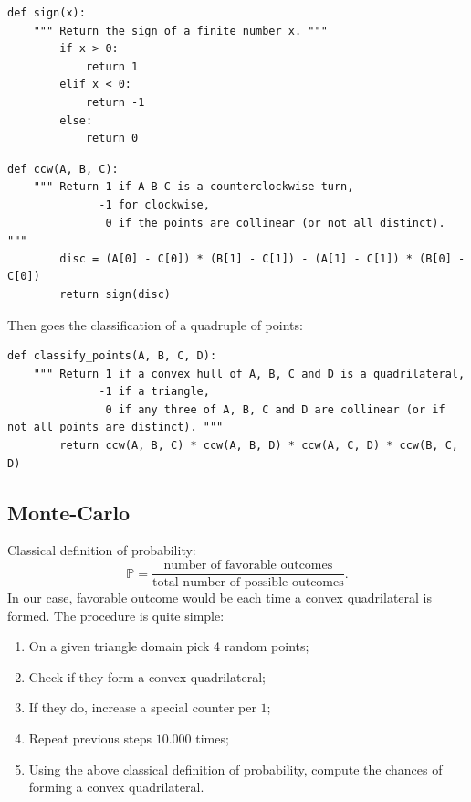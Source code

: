 \documentclass{article}
\renewcommand{\P}{\mathbb{P}}
\begin{document}
\begin{lstlisting}[caption=Sign helper function.]
    def sign(x):
    """ Return the sign of a finite number x. """
        if x > 0:
            return 1
        elif x < 0:
            return -1
        else:
            return 0    
\end{lstlisting}

\begin{lstlisting}[caption=Turn definition.]
    def ccw(A, B, C):
    """ Return 1 if A-B-C is a counterclockwise turn, 
              -1 for clockwise,
               0 if the points are collinear (or not all distinct). """
        disc = (A[0] - C[0]) * (B[1] - C[1]) - (A[1] - C[1]) * (B[0] - C[0])
        return sign(disc)
\end{lstlisting}

Then goes the classification of a quadruple of points:
\begin{lstlisting}[caption=Point classification.]
    def classify_points(A, B, C, D):
    """ Return 1 if a convex hull of A, B, C and D is a quadrilateral,
              -1 if a triangle,
               0 if any three of A, B, C and D are collinear (or if not all points are distinct). """
        return ccw(A, B, C) * ccw(A, B, D) * ccw(A, C, D) * ccw(B, C, D)
\end{lstlisting}


\subsection{Monte-Carlo}

Classical definition of probability:
\begin{equation}
    \P = \frac{\text{number of favorable outcomes}}{\text{total number of possible outcomes}}.
\end{equation}
In our case, favorable outcome would be each time a convex quadrilateral is formed.
The procedure is quite simple:
\begin{enumerate}
    \item On a given triangle domain pick 4 random points;
    \item Check if they form a convex quadrilateral;
    \item If they do, increase a special counter per $1$;
    \item Repeat previous steps $10.000$ times;
    \item Using the above classical definition of probability, compute the chances of forming a convex quadrilateral.
\end{enumerate}
\end{document}
